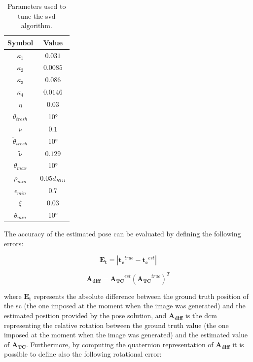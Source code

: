\begin{table}[htbp]
  \centering
  \begin{tabular}{cc}
    \hline
    \hline
    Symbol                   & Value          \\
    \hline
    $\kappa_1$               & $0.031$        \\
    \hline
    $\kappa_2$               & $0.0085$       \\
    \hline
    $\kappa_3$               & $0.086$        \\
    \hline
    $\kappa_4$               & $0.0146$       \\
    \hline
    $\eta$                   & $0.03$         \\
    \hline
    $\theta_{tresh}$         & \ang{10}       \\
    \hline
    $\nu$                    & $0.1$          \\
    \hline
    $\tilde{\theta}_{tresh}$ & \ang{10}       \\
    \hline
    $\tilde{\nu}$            & $0.129$        \\
    \hline
    $\theta_{max}$           & \ang{10}       \\
    \hline
    $\rho_{min}$             & $0.05 d_{ROI}$ \\
    \hline
    $\epsilon_{min}$         & 0.7            \\
    \hline
    $\xi$                    & $0.03$         \\
    \hline
    $\theta_{min}$           & \ang{10}       \\
    \hline
    \hline
  \end{tabular}
  \caption{Parameters used to tune the \acrshort{svd} algorithm.}
  \label{tab:svdParameters}
\end{table}

The accuracy of the estimated pose can be evaluated by defining the following errors:

\begin{equation}
  \mathbf{E_t} = |\mathbf{t_c}^{true} - \mathbf{t_c}^{est}|
\end{equation}

\begin{equation}
  \mathbf{A_{diff}} = \mathbf{A_{TC}}^{est}(\mathbf{A_{TC}}^{true})^T
\end{equation}

where $\mathbf{E_t}$ represents the absolute difference between the ground truth position of the \acrshort{sc} (the one imposed at the moment when the image was generated) and the estimated position provided by the pose solution, and $\mathbf{A_{diff}}$ is the \acrshort{dcm} representing the relative rotation between the ground truth value (the one imposed at the moment when the image was generated) and the estimated value of $\mathbf{A_{TC}}$.
Furthermore, by computing the quaternion representation of $\mathbf{A_{diff}}$ it is possible to define also the following rotational error:

